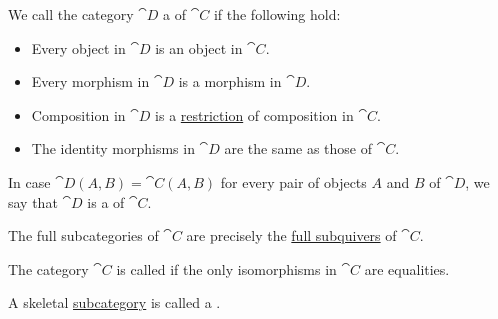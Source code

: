 \begin{definition}\label{def:subcategory}
  We call the category \( \cat{D} \) a  of \( \cat{C} \) if the following hold:
  \begin{itemize}
    \item Every object in \( \cat{D} \) is an object in \( \cat{C} \).
    \item Every morphism in \( \cat{D} \) is a morphism in \( \cat{D} \).
    \item Composition in \( \cat{D} \) is a \hyperref[def:multi_valued_function/restriction]{restriction} of composition in \( \cat{C} \).
    \item The identity morphisms in \( \cat{D} \) are the same as those of \( \cat{C} \).
  \end{itemize}

  In case \( \cat{D}(A, B) = \cat{C}(A, B) \) for every pair of objects \( A \) and \( B \) of \( \cat{D} \), we say that \( \cat{D} \) is a  of \( \cat{C} \).

  The full subcategories of \( \cat{C} \) are precisely the \hyperref[eq:def:theory_of_graphs/submodel/full]{full subquivers} of \( \cat{C} \).
\end{definition}

\begin{definition}\label{def:skeletal_category}
  The category \( \cat{C} \) is called  if the only isomorphisms in \( \cat{C} \) are equalities.

  A skeletal \hyperref[def:subcategory]{subcategory} is called a .
\end{definition}

